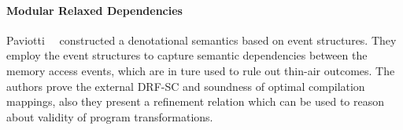\paragraph{Modular Relaxed Dependencies}

Paviotti~\etal~\cite{Paviotti-al:ESOP20} constructed a 
denotational semantics based on event structures. 
They employ the event structures to capture 
semantic dependencies between the memory access events, 
which are in ture used to rule out thin-air outcomes.
The authors prove the external DRF-SC and 
soundness of optimal compilation mappings,
also they present a refinement relation which 
can be used to reason about validity of program transformations. 
